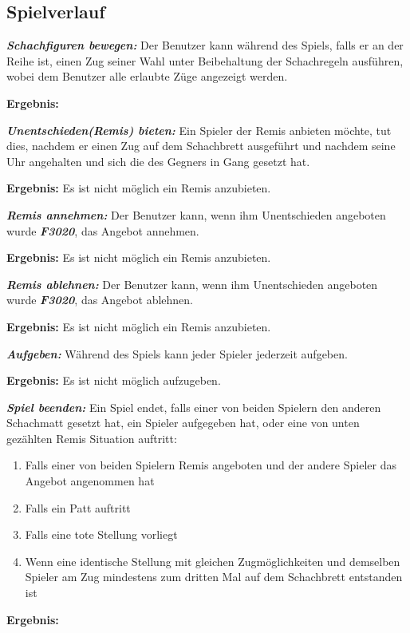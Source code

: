 \documentclass[parskip=full]{scrartcl}
\begin{document}
\subsection{Spielverlauf} 
\begin{description}
	\item[F3010]\textbf{\textit{Schachfiguren bewegen: }}Der Benutzer kann während des Spiels, falls er an der Reihe ist, einen Zug seiner Wahl unter Beibehaltung der Schachregeln ausführen, wobei dem Benutzer alle erlaubte Züge  angezeigt werden.
	\item \textbf{Ergebnis: } 
	
	\item[F3020] \textbf{\textit{Unentschieden(Remis) bieten: }} Ein Spieler der Remis anbieten möchte, tut dies, nachdem er einen Zug auf dem Schachbrett ausgeführt und nachdem seine Uhr angehalten und sich die des Gegners in Gang gesetzt hat.
	\item \textbf{Ergebnis: } Es ist nicht möglich ein Remis anzubieten.
	
	\item[F3030] \textbf{\textit{Remis annehmen: }} Der Benutzer kann, wenn ihm Unentschieden angeboten wurde \textbf{\textit{F3020}}, das Angebot annehmen.
	\item \textbf{Ergebnis: } Es ist nicht möglich ein Remis anzubieten.
	
	\item[F3040] \textbf{\textit{Remis ablehnen: }} Der Benutzer kann, wenn ihm Unentschieden angeboten wurde \textbf{\textit{F3020}}, das Angebot ablehnen.
	\item \textbf{Ergebnis: } Es ist nicht möglich ein Remis anzubieten.	
	
	\item[F3050] \textbf{\textit{Aufgeben: }} Während des Spiels kann jeder Spieler jederzeit aufgeben.
	\item \textbf{Ergebnis: } Es ist nicht möglich aufzugeben.
	
	\item[F3060] \textbf{\textit{Spiel beenden: }} Ein Spiel endet, falls einer von beiden Spielern den anderen Schachmatt gesetzt hat, ein Spieler aufgegeben hat, oder eine von unten gezählten Remis Situation auftritt:
	\begin{enumerate}	    
		\item Falls einer von beiden Spielern Remis angeboten und der andere Spieler das Angebot angenommen hat
		\item Falls ein Patt auftritt
		\item Falls eine tote Stellung vorliegt
		\item Wenn eine identische Stellung mit gleichen Zugmöglichkeiten und demselben Spieler am Zug mindestens zum dritten Mal auf dem Schachbrett entstanden ist 
	\end{enumerate}
	\item \textbf{Ergebnis: }
	

\end{description}
\end{document}
